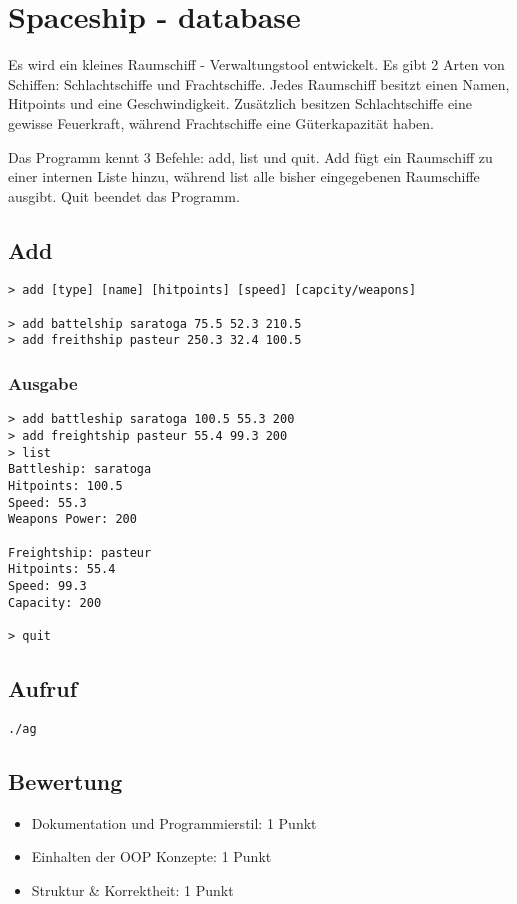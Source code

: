 \documentclass[a4paper,10pt]{article}
\begin{document}
\section*{Spaceship - database}

Es wird ein kleines Raumschiff - Verwaltungstool entwickelt.
Es gibt 2 Arten von Schiffen: Schlachtschiffe und Frachtschiffe. 
Jedes Raumschiff besitzt einen Namen, Hitpoints und eine Geschwindigkeit.
Zusätzlich besitzen Schlachtschiffe eine gewisse Feuerkraft, während Frachtschiffe eine Güterkapazität haben.

Das Programm kennt 3 Befehle: add, list und quit.
Add fügt ein Raumschiff zu einer internen Liste hinzu, während list alle bisher eingegebenen Raumschiffe ausgibt. Quit beendet das Programm.

\subsection*{Add}
\begin{verbatim}
> add [type] [name] [hitpoints] [speed] [capcity/weapons]

> add battelship saratoga 75.5 52.3 210.5
> add freithship pasteur 250.3 32.4 100.5
\end{verbatim}



\subsubsection*{Ausgabe}
\begin{verbatim}
> add battleship saratoga 100.5 55.3 200
> add freightship pasteur 55.4 99.3 200
> list
Battleship: saratoga
Hitpoints: 100.5
Speed: 55.3
Weapons Power: 200

Freightship: pasteur
Hitpoints: 55.4
Speed: 99.3
Capacity: 200

> quit
\end{verbatim}

\subsection*{Aufruf}
\texttt{./ag}

\subsection*{Bewertung}
\begin{itemize}
 \item Dokumentation und Programmierstil: 1 Punkt
 \item Einhalten der OOP Konzepte: 1 Punkt
 \item Struktur \& Korrektheit: 1 Punkt
\end{itemize}

\newpage
\end{document}
